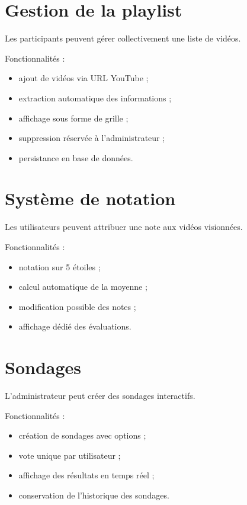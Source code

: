 \documentclass[12pt,a4paper]{report}
\begin{document}
\section{Gestion de la playlist}

Les participants peuvent gérer collectivement une liste de vidéos.

Fonctionnalités :
\begin{itemize}
  \item ajout de vidéos via URL YouTube ;
  \item extraction automatique des informations ;
  \item affichage sous forme de grille ;
  \item suppression réservée à l’administrateur ;
  \item persistance en base de données.
\end{itemize}

\section{Système de notation}

Les utilisateurs peuvent attribuer une note aux vidéos visionnées.

Fonctionnalités :
\begin{itemize}
  \item notation sur 5 étoiles ;
  \item calcul automatique de la moyenne ;
  \item modification possible des notes ;
  \item affichage dédié des évaluations.
\end{itemize}

\section{Sondages}

L’administrateur peut créer des sondages interactifs.

Fonctionnalités :
\begin{itemize}
  \item création de sondages avec options ;
  \item vote unique par utilisateur ;
  \item affichage des résultats en temps réel ;
  \item conservation de l’historique des sondages.
\end{itemize}
\end{document}

